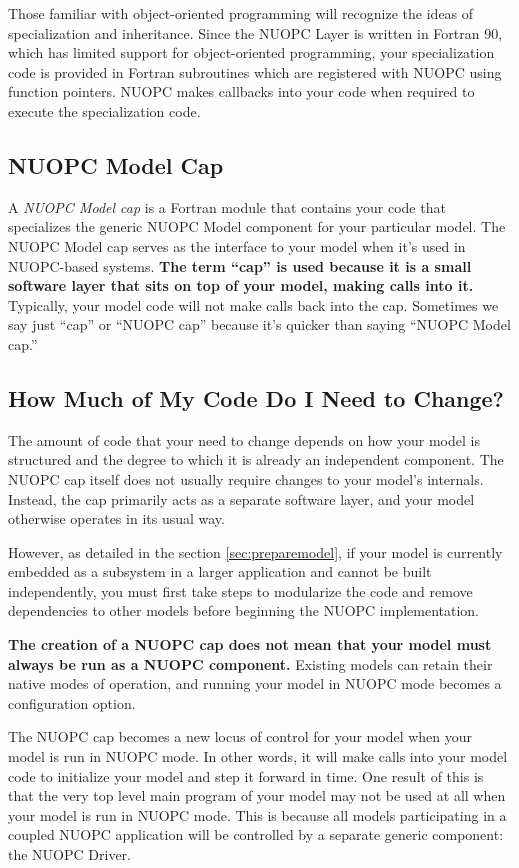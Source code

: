 Those familiar with object-oriented programming will recognize
the ideas of specialization and inheritance.  Since the NUOPC Layer
is written in Fortran 90, which has limited support for
object-oriented programming, your specialization code is
provided in Fortran subroutines which are registered with
NUOPC using function pointers.  NUOPC makes callbacks into
your code when required to execute the specialization code.


\subsection{NUOPC Model Cap}
A \emph{NUOPC Model cap} is a Fortran module that contains your code
that specializes the generic NUOPC Model component for your
particular model.  The NUOPC Model cap serves as the interface
to your model when it's used in NUOPC-based systems.
\textbf{The term ``cap'' is used because it is
a small software layer that sits on top of your model, making
calls into it.}  Typically, your model code will not make calls
back into the cap.  Sometimes we say just ``cap'' or ``NUOPC cap''
because it's quicker than saying ``NUOPC Model cap.''


\subsection{How Much of My Code Do I Need to Change?}
The amount of code that your need to change depends on how your
model is structured and the degree to which it is already an
independent component.  The NUOPC cap itself does not usually require
changes to your model's internals.  Instead, the cap primarily
acts as a separate software layer, and your model otherwise
operates in its usual way.

However, as detailed in the section \ref{sec:preparemodel},
if your model is currently embedded as a subsystem in a larger
application and cannot be built independently, you must first take
steps to modularize the code and remove dependencies to other
models before beginning the NUOPC implementation.

\textbf{The creation of a NUOPC cap does not mean that your
model must always be run as a NUOPC component.}  Existing models can
retain their native modes of operation, and running your model in
NUOPC mode becomes a configuration option.

The NUOPC cap becomes a new locus of control for your model when
your model is run in NUOPC mode. In other words, it will make calls into your
model code to initialize your model and step it forward in time.
One result of this is that the very top level main program of
your model may not be used at all when your model is run in
NUOPC mode.  This is because all models participating in a coupled
NUOPC application will be controlled by a separate generic component:
the NUOPC Driver.

